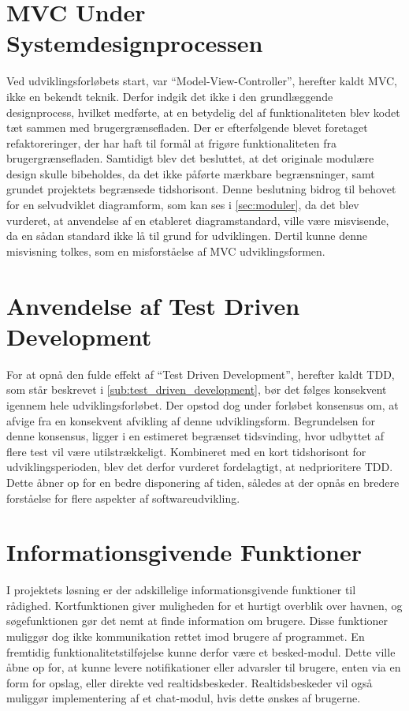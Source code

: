\section{MVC Under Systemdesignprocessen}

Ved udviklingsforløbets start, var \enquote{Model-View-Controller}, herefter kaldt MVC, ikke en bekendt teknik. Derfor indgik det ikke i den grundlæggende designprocess, hvilket medførte, at en betydelig del af funktionaliteten blev kodet tæt sammen med brugergrænsefladen. Der er efterfølgende blevet foretaget refaktoreringer, der har haft til formål at frigøre funktionaliteten fra brugergrænsefladen. Samtidigt blev det besluttet, at det originale modulære design skulle bibeholdes, da det ikke påførte mærkbare begrænsninger, samt grundet projektets begrænsede tidshorisont. Denne beslutning bidrog til behovet for en selvudviklet diagramform, som kan ses i \cref{sec:moduler}, da det blev vurderet, at anvendelse af en etableret diagramstandard, ville være misvisende, da en sådan standard ikke lå til grund for udviklingen. Dertil kunne denne misvisning tolkes, som en misforståelse af MVC udviklingsformen.

\section{Anvendelse af Test Driven Development}

For at opnå den fulde effekt af \enquote{Test Driven Development}, herefter kaldt TDD, som står beskrevet i \cref{sub:test_driven_development}, bør det følges konsekvent igennem hele udviklingsforløbet. Der opstod dog under forløbet konsensus om, at afvige fra en konsekvent afvikling af denne udviklingsform. Begrundelsen for denne konsensus, ligger i en estimeret begrænset tidsvinding, hvor udbyttet af flere test vil være utilstrækkeligt. Kombineret med en kort tidshorisont for udviklingsperioden, blev det derfor vurderet fordelagtigt, at nedprioritere TDD. Dette åbner op for en bedre disponering af tiden, således at der opnås en bredere forståelse for flere aspekter af softwareudvikling.

\section{Informationsgivende Funktioner}

I projektets løsning er der adskillelige informationsgivende funktioner til rådighed. Kortfunktionen giver muligheden for et hurtigt overblik over havnen, og søgefunktionen gør det nemt at finde information om brugere. Disse funktioner muliggør dog ikke kommunikation rettet imod brugere af programmet. En fremtidig funktionalitetstilføjelse kunne derfor være et besked-modul. Dette ville åbne op for, at kunne levere notifikationer eller advarsler til brugere, enten via en form for opslag, eller direkte ved realtidsbeskeder. Realtidsbeskeder vil også muliggør implementering af et chat-modul, hvis dette ønskes af brugerne.